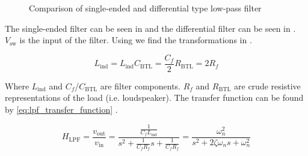 \begin{figure}[htbp]
	\centering
	\begin{subfigure}[b]{0.4\textwidth}
		\begin{circuitikz}
			
		\end{circuitikz}
		\label{fig:single_ended_lp_filter}
	\end{subfigure}%
	\begin{subfigure}[b]{0.4\textwidth}
		\begin{circuitikz}
			
		\end{circuitikz}
		\label{fig:differential_lp_filter}
	\end{subfigure}
	\caption{Comparison of single-ended and differential type low-pass filter}
\end{figure}

The single-ended filter can be seen in  and the differential filter can be seen in . $V_{\mathrm{sw}}$ is the input of the filter. Using \cite{design_diff_filters_ti} we find the transformations in .

\begin{subequations}
	\begin{equation} \label{eq:l_ind}
		L_{\mathrm{ind}} = L_{\mathrm{ind}}
	\end{equation}
	\begin{equation} \label{eq:c_btl_f}
		C_{\mathrm{BTL}} = \frac{C_{f}}{2}
	\end{equation}
	\begin{equation} \label{eq:r_btl_f}
		R_{\mathrm{BTL}} = 2 R_{f}
	\end{equation}
\end{subequations}

Where $L_{\mathrm{ind}}$ and $C_{f}$/$C_{\mathrm{BTL}}$ are filter components. $R_{f}$ and $R_{\mathrm{BTL}}$ are crude resistive representations of the load (i.e. loudspeaker). The transfer function can be found by \autoref{eq:lpf_transfer_function} \cite{multivar_ctrl_loops_for_SM_audio_systems}.

\begin{equation} \label{eq:lpf_transfer_function}
	H_{\mathrm{LPF}} = \frac{v_{\mathrm{out}}}{v_{\mathrm{in}}} = \frac{\frac{1}{C_{f}L_{\mathrm{ind}}}}{s^{2} + \frac{1}{C_{f}R_{f}}s + \frac{1}{C_{f}R_{f}}} = \frac{\omega_{n}^{2}}{s^{2} + 2\zeta \omega_{n}s + \omega_{n}^{2}}
\end{equation}

